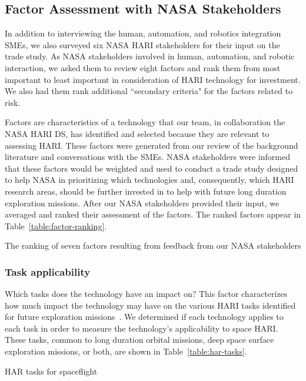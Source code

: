 \subsection{Factor Assessment with NASA Stakeholders}
In addition to interviewing the human, automation, and robotics integration SMEs, we also surveyed six NASA HARI stakeholders for their input on the trade study.
As NASA stakeholders involved in human, automation, and robotic interaction, we asked them to review eight factors and rank them from most important to least important in consideration of HARI technology for investment.
We also had them rank additional ``secondary criteria" for the factors related to risk.

Factors are characteristics of a technology that our team, in collaboration the NASA HARI DS, has identified and selected because they are relevant to assessing HARI.
These factors were generated from our review of the background literature and conversations with the SMEs.
NASA stakeholders were informed that these factors would be weighted and used to conduct a trade study designed to help NASA in prioritizing which technologies and, consequently, which HARI research areas, should be further invested in to help with future long duration exploration missions.
After our NASA stakeholders provided their input, we averaged and ranked their assessment of the factors.
The ranked factors appear in Table~\ref{table:factor-ranking}.

\begin{table}[tb]
    \centering
    \caption{The ranking of seven factors resulting from feedback from our NASA stakeholders}
    \label{table:factor-ranking}
\end{table}

\subsubsection{Task applicability}
Which tasks does the technology have an impact on? This factor characterizes how much impact the technology may have on the various HARI tasks identified for future exploration missions~\citep{marquez2017future}.
We determined if each technology applies to each task in order to measure the technology's applicability to space HARI.
These tasks, common to long duration orbital missions, deep space surface exploration missions, or both, are shown in Table~\ref{table:har-tasks}.

\begin{table}[tb]
    \centering
    \caption{HAR tasks for spaceflight}
    \label{table:har-tasks}
\end{table}

